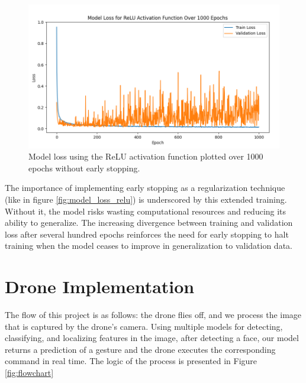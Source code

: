 \begin{figure}[ht!]
	\centering
	\includegraphics[width=\textwidth]{images/model_loss_over_1000_epochs.png}
	\caption{Model loss using the ReLU activation function plotted over 1000 epochs without early stopping.}
	\label{fig:epochs}
\end{figure}
The importance of implementing early stopping as a regularization technique (like in figure \ref{fig:model_loss_relu}) is underscored by this extended training. Without it, the model risks wasting computational resources and reducing its ability to generalize. The increasing divergence between training and validation loss after several hundred epochs reinforces the need for early stopping to halt training when the model ceases to improve in generalization to validation data.

\section{Drone Implementation}

The flow of this project is as follows: the drone flies off, and we process the image that is captured by the drone's camera. Using multiple models for detecting, classifying, and localizing features in the image, after detecting a face, our model returns a prediction of a gesture and the drone executes the corresponding command in real time. The logic of the process is presented in Figure \ref{fig:flowchart}


